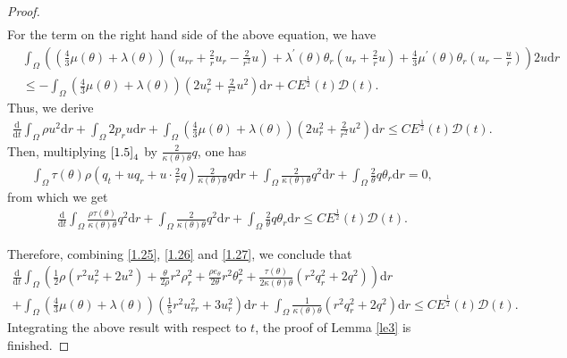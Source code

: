 \documentclass[11pt,reqno]{amsart}
\numberwithin{equation}{section}
\newcommand{\dif}{\mathrm{d}}
\begin{document}
\begin{proof}
{\begin{align*}
\end{align*}}
For the term on the right hand side of the above equation, we have{\small
\begin{align*}
&\int_{\Omega} \left(\left(\frac{4}{3} \mu(\theta)+\lambda(\theta)\right)\left(u_{rr}+\frac{2}{r}u_r-\frac{2}{r^2} u\right)+\lambda^\prime(\theta)\theta_r\left(u_r+\frac{2}{r}u\right)+\frac{4}{3}\mu^\prime(\theta) \theta_r\left(u_r-\frac{u}{r}\right) \right)2 u \dif r\\
&\le -\int_{\Omega} \left(\frac{4}{3} \mu(\theta)+\lambda(\theta)\right)\left(2u_r^2+\frac{2}{r^2} u^2 \right)\dif r+CE^\frac{1}{2}(t) \mathcal D(t).
\end{align*}}
Thus, we derive
\begin{align}\label{1.26}
\frac{\dif}{\dif t} \int_{\Omega} \rho u^2 \dif r+\int_{\Omega}  2p_r  u \dif r+\int_{\Omega} \left(\frac{4}{3} \mu(\theta)+\lambda(\theta)\right)\left(2u_r^2+\frac{2}{r^2} u^2 \right)\dif r \le CE^\frac{1}{2}(t) \mathcal D(t).
 \end{align}
 Then, multiplying  $\eqref{1.5}_4$ by $\frac{2}{\kappa(\theta)\theta} q$, one has
 \begin{align*}
 \int_{\Omega} \tau(\theta) \rho (q_t+uq_r+u\cdot \frac{2}{r} q) \frac{2}{\kappa (\theta)\theta} q \dif r+\int_{\Omega} \frac{2}{\kappa(\theta)\theta} q^2 \dif r+\int_{\Omega} \frac{2}{\theta} q \theta_r \dif r=0,
 \end{align*}
 from which we get
 \begin{align}\label{1.27}
 \frac{\dif}{\dif t} \int_{\Omega} \frac{  \rho \tau(\theta)}{\kappa(\theta) \theta} q^2 \dif r +\int_{\Omega} \frac{2}{\kappa(\theta)\theta} q^2 \dif r+\int_{\Omega} \frac{2}{\theta} q \theta_r \dif r \le CE^\frac{1}{2}(t) \mathcal D(t).
 \end{align}


 Therefore, combining \eqref{1.25}, \eqref{1.26} and \eqref{1.27}, we conclude that
 \begin{align*}
  \frac{\dif}{\dif t} \int_{\Omega} \left(\frac{1}{2} \rho (r^2 u_r^2+2u^2)+\frac{\theta}{2\rho} r^2\rho_r^2+\frac{\rho e_\theta}{2\theta} r^2 \theta_r^2+\frac{\tau(\theta)}{2\kappa(\theta)\theta}(r^2 q_r^2+2q^2)\right)\dif r  \\
+  \int_{\Omega} \left(\frac{4}{3} \mu(\theta)+\lambda(\theta)\right)\left(\frac{1}{5} r^2 u_{rr}^2+3u_r^2\right) \dif r +\int_{\Omega} \frac{1}{\kappa(\theta)\theta} (r^2 q_r^2+2q^2) \dif r \le CE^\frac{1}{2}(t) \mathcal D(t).
 \end{align*}
 Integrating the above result with respect to $t$, the proof  of Lemma \ref{le3} is finished.
 \end{proof}
\end{document}
